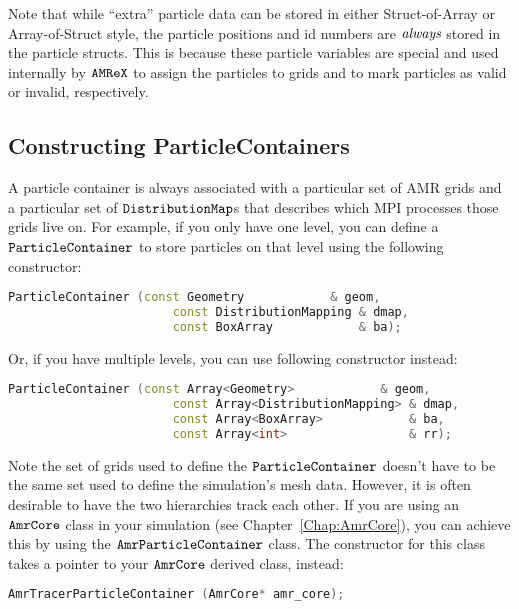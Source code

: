 Note that while ``extra'' particle data can be stored in either Struct-of-Array or Array-of-Struct style, the particle positions and id numbers are $\emph{always}$ stored in the particle
structs. This is because these particle variables are special and used internally by $\tt{AMReX}$ to assign the particles to grids and to mark particles as valid or invalid, respectively.

\subsection{Constructing ParticleContainers}

A particle container is always associated with a particular set of AMR grids and a particular set of $\tt{DistributionMap}$s that describes which MPI processes those grids live on.
For example, if you only have one level, you can define a $\tt{ParticleContainer}$ to store particles on that level using the following constructor:

\begin{lstlisting}[language=cpp]
    ParticleContainer (const Geometry            & geom,
                       const DistributionMapping & dmap,
                       const BoxArray            & ba);
\end{lstlisting}

Or, if you have multiple levels, you can use following constructor instead:

\begin{lstlisting}[language=cpp]
    ParticleContainer (const Array<Geometry>            & geom,
                       const Array<DistributionMapping> & dmap,
                       const Array<BoxArray>            & ba,
                       const Array<int>                 & rr);
\end{lstlisting}

Note the set of grids used to define the $\tt{ParticleContainer}$ doesn't have to be the same set used to define the simulation's mesh data. However, it is often desirable to have
the two hierarchies track each other. If you are using an $\tt{AmrCore}$ class in your simulation (see Chapter~\ref{Chap:AmrCore}), you can achieve this by using 
the $\tt{AmrParticleContainer}$ class. The constructor for this class takes a pointer to your $\tt{AmrCore}$ derived class, instead:

\begin{lstlisting}[language=cpp]
  AmrTracerParticleContainer (AmrCore* amr_core);
\end{lstlisting}

